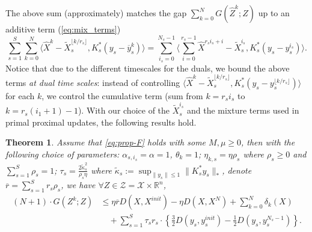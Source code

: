 \documentclass[10pt]{article}
\newcommand{\mc}{\mathcal}
\newcommand{\R}{\mathbb{R}}
\newtheorem{theorem}{Theorem}[section]
\begin{document}
The above sum (approximately) matches the gap $\sum_{k=0}^N G(\widehat{Z}^k;Z)$ up to an additive term (\eqref{eq:mix_terms})
\begin{displaymath}
    \sum_{s=1}^S \sum_{k=0}^{N}\langle \widehat{X}^{k}-\widetilde{X}_{s}^{\lfloor k/r_s\rfloor},K^*_{s}(y_s-\overline{y}_s^{k})\rangle = \sum_{i_s=0}^{N_s-1}\langle\sum_{i=0}^{r_s-1} \widehat{X}^{r_si_s+i}-\widetilde{X}_{s}^{i_s},K^*_{s}(y_s-y_s^{i_s})\rangle.
\end{displaymath}
Notice that due to the different timescales for the duals, we bound the above terms \textit{at dual time scales}: instead of controlling $\langle \widehat{X}^{k}-\widetilde{X}_{s}^{\lfloor k/r_s\rfloor},K^*_{s}(y_s-y_s^{\lfloor k/r_s\rfloor})\rangle$ for each $k$, we control the cumulative term (sum from $k=r_si_s$ to $k = r_s(i_1+1)-1$). With our choice of the $\widetilde{X}_s^{i_s}$ and the mixture terms used in primal proximal updates, the following results hold. 

\begin{theorem}\label{thm:main}
Assume that \eqref{eq:prop-F} holds with some $M,\mu \geq 0$, then with the following choice of parameters: $\alpha_{s,i_s}=\alpha=1$, $\theta_k = 1$; $\eta_{k,s} = \eta\rho_s$ where $\rho_s\geq 0$ and $\sum_{s=1}^S\rho_s = 1$; $\tau_s = \frac{2\widetilde{\kappa}_s^2}{\rho_s\eta}$ where $\widetilde{\kappa}_{s}:=\sup_{\|y_s\|\leq 1}\|K_{s}^*y_s\|_{*}$, denote $\overline{r} = \sum_{s=1}^S r_s\rho_s$, we have $\forall Z\in \mc Z = \mc X\times \R^n$, 
\begin{align*}
(N+1)\cdot G(Z^k;Z)&\leq \eta\overline{r}D(X,X^{init}) - \eta  D(X,X^N) +\sum_{k=0}^N \delta_k(X)\\
    &\quad +  \sum_{s=1}^S \tau_{s}r_s\cdot\left\{\frac{3}{2}D(y_s,y_s^{init}) - \frac{1}{2}D(y_s,y_s^{N_s-1})\right\}.
\end{align*}
\end{theorem}
\end{document}
